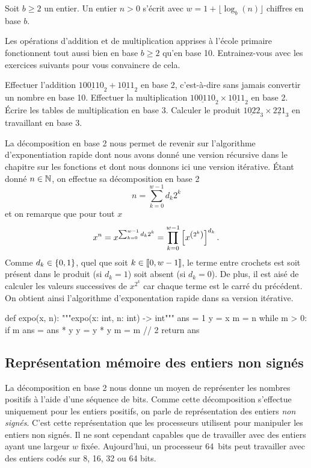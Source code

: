 \documentclass{magnolia}
\begin{document}
\begin{proposition}
  Soit $b \geq 2$ un entier. Un entier $n > 0$ s'écrit avec $w=1 + \lfloor \log_b (n) \rfloor$ chiffres
    en base $b$.
  \end{proposition}

\vspace{2ex}
Les opérations d'addition et de multiplication apprises à l'école primaire fonctionnent
tout aussi bien en base $b\geq 2$ qu'en base 10. Entrainez-vous avec les exercices suivants pour
vous convaincre de cela.
\vspace{2ex}
\begin{exos}
\exo Effectuer l'addition $\underline{100110}_2 + \underline{1011}_2$
  en base 2, c'est-à-dire sans jamais convertir un nombre en base 10.
\exo Effectuer la multiplication $\underline{100110}_2 \times \underline{1011}_2$
  en base 2.
\exo Écrire les tables de multiplication en base 3. Calculer
  le produit $\underline{1022}_3 \times \underline{221}_3$ en travaillant en base 3.
\end{exos}
\vspace{2ex}
La décomposition en base 2 nous permet de revenir sur l'algorithme d'exponentiation
rapide dont nous avons donné une version récursive dans le chapitre sur les fonctions et
dont nous donnons ici une version itérative. Étant donné $n\in\mathbb{N}$, on effectue
sa décomposition en base 2
\[n=\sum_{k=0}^{w-1} d_k 2^k\]
et on remarque que pour tout $x$
\[x^n=x^{\sum_{k=0}^{w-1} d_k 2^k}=\prod_{k=0}^{w-1} \left[x^{\left(2^k\right)}\right]^{d_k}.\]
Comme $d_k\in\left\{0,1\right\}$, quel que soit $k\in\left\llbracket 0,w-1\right\rrbracket$, le terme entre crochets
est soit présent dans le produit (si $d_k=1$) soit absent (si $d_k=0$). De plus, il est aisé de calculer les
valeurs successives de $x^{2^k}$ car chaque terme est le carré du précédent.
On obtient ainsi l'algorithme d'exponentation rapide dans sa version itérative.

\begin{pythoncodeline}
def expo(x, n):
    """expo(x: int, n: int) -> int"""
    ans = 1
    y = x
    m = n
    while m > 0:
        if m %
            ans = ans * y
        y = y * y
        m = m // 2
    return ans
\end{pythoncodeline}

\subsection{Représentation mémoire des entiers non signés}

La décomposition en base 2 nous donne un moyen de représenter les nombres positifs
à l'aide d'une séquence de bits.  Comme cette décomposition s'effectue uniquement pour
les entiers positifs, on parle de représentation des entiers \emph{non signés}. C'est cette
représentation que les processeurs utilisent pour manipuler les entiers non signés. Il ne sont
cependant capables que de travailler avec des entiers ayant une largeur $w$ fixée.
Aujourd'hui, un processeur 64~bits peut travailler avec des entiers codés sur 8, 16, 32
ou 64 bits.
\end{document}
